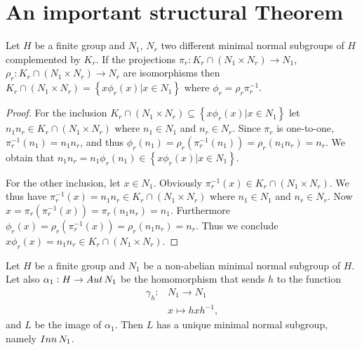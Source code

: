 \section{An important structural Theorem}

\begin{theorem}
    \label{phireq}
    Let $H$ be a finite group and $N_1$, $N_r$ two different minimal normal subgroups of $H$ complemented by $K_r$. If the projections $\pi_r : K_r \cap (N_1 \times N_r) \rightarrow N_1$, $\rho_r : K_r \cap (N_1 \times N_r) \rightarrow N_r$ are isomorphisms then $K_r \cap (N_1 \times N_r) = \left\{x\phi_r(x) | x \in N_1\right\}$ where $\phi_r = \rho_r\pi_r^{-1}$.
\end{theorem}

\begin{proof}
    For the inclusion $K_r \cap (N_1 \times N_r) \subseteq \left\{x\phi_r(x) | x \in N_1\right\}$ let $n_1n_r \in K_r \cap (N_1 \times N_r)$ where $n_1 \in N_1$ and $n_r \in N_r$.
    Since $\pi_r$ is one-to-one, $\pi^{-1}_r(n_1) = n_1n_r$, and thus $\phi_r(n_1) = \rho_r(\pi^{-1}_r(n_1)) = \rho_r(n_1n_r) = n_r$. We obtain that $n_1n_r = n_1\phi_r(n_1) \in \left\{x\phi_r(x) | x \in N_1\right\}$.

    For the other inclusion, let $x \in N_1$. Obviously 
    $\pi_r^{-1}(x) \in K_r \cap (N_1 \times N_r)$. 
    We thus have $\pi_r^{-1}(x) = n_1n_r \in K_r \cap (N_1 \times N_r)$  where $n_1 \in N_1$ and $n_r \in N_r$. 
    Now $x = \pi_r(\pi_r^{-1}(x)) = \pi_r(n_1n_r) = n_1$. 
    Furthermore $\phi_r(x) = \rho_r(\pi_r^{-1}(x)) = \rho_r(n_1n_r) = n_r$. Thus we conclude $x\phi_r(x) = n_1n_r \in K_r \cap (N_1 \times N_r)$.
\end{proof}

\begin{theorem}
    \label{imgaut}
    Let $H$ be a finite group and $N_1$ be a non-abelian minimal normal subgroup of $H$. Let also $\alpha_1: H \rightarrow Aut\, {N}_1$ be the homomorphism that sends $h$ to the function
    \begin{align*}
        \gamma_h \colon &N_1 \rightarrow N_1 \\
                        &x \mapsto hxh^{-1},
    \end{align*}
    and $L$ be the image of $\alpha_1$. 
    Then $L$ has a unique minimal normal subgroup, namely $Inn\, {N}_1$.
\end{theorem}

